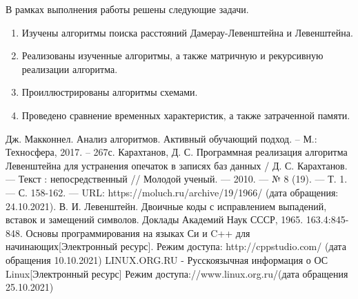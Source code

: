 \documentclass[12pt,a4paper]{report}
\begin{document}
В рамках выполнения работы решены следующие задачи.

\begin{enumerate}
	\item Изучены алгоритмы поиска расстояний Дамерау-Левенштейна и Левенштейна.
	\item Реализованы изученные алгоритмы, а также матричную и рекурсивную реализации алгоритма.
	\item Проиллюстрированы алгоритмы схемами.
	\item Проведено сравнение временных характеристик, а также затраченной памяти.
\end{enumerate}


\newpage
\renewcommand\bibname{Список литературы}
\makeatletter %
\def\@biblabel#1{#1. }
\makeatother
\begin{thebibliography}{2}
	 Дж. Макконнел. Анализ алгоритмов. Активный обучающий подход. -- М.: Техносфера, 2017. -- 267с.
	 Карахтанов, Д. С. Программная реализация алгоритма Левенштейна для устранения опечаток в записях баз данных
	/ Д. С. Карахтанов. — Текст : непосредственный // Молодой ученый. — 2010. — № 8 (19). — Т. 1. — С. 158-162. — 
	URL: https://moluch.ru/archive/19/1966/ (дата обращения: 24.10.2021).
	В. И. Левенштейн. Двоичные коды с исправлением выпадений, вставок и замещений символов. Доклады Академий Наук СССР, 1965. 163.4:845-848.
	Основы программирования на языках Си и C++ для начинающих[Электронный ресурс]. Режим доступа: http://cppstudio.com/ (дата обращения 10.10.2021)
	LINUX.ORG.RU - Русскоязычная информация о ОС Linux[Электронный ресурс] Режим доступа://www.linux.org.ru/(дата обращения 25.10.2021)
	
\end{thebibliography}
\end{document}
